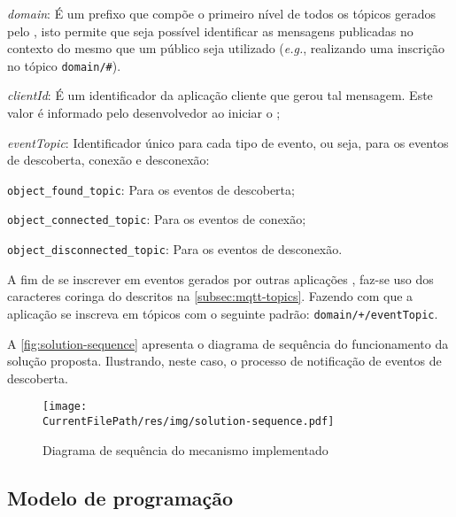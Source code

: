\begin{alineas}
	\item \emph{domain}: É um prefixo que compõe o primeiro nível de todos os tópicos gerados pelo \cddl, isto permite que seja possível identificar as mensagens publicadas no contexto do \middleware mesmo que um \broker público seja utilizado (\textit{e.g.}, realizando uma inscrição no tópico \texttt{domain/\#}).

	\item \emph{clientId}: É um identificador da aplicação cliente que gerou tal mensagem. Este valor é informado pelo desenvolvedor ao iniciar o \cddl;

	\item \emph{eventTopic}: Identificador único para cada tipo de evento, ou seja, para os eventos de descoberta, conexão e desconexão:
	\begin{alineas}
		\item \texttt{object\_found\_topic}: Para os eventos de descoberta;
		\item \texttt{object\_connected\_topic}: Para os eventos de conexão;
		\item \texttt{object\_disconnected\_topic}: Para os eventos de desconexão.
	\end{alineas}
\end{alineas}


A fim de se inscrever em eventos gerados por outras aplicações \mhubcddl, faz-se uso dos caracteres coringa do \mqtt descritos na \autoref{subsec:mqtt-topics}. Fazendo com que a aplicação se inscreva em tópicos com o seguinte padrão: \texttt{domain/+/eventTopic}.


A \autoref{fig:solution-sequence} apresenta o diagrama de sequência do funcionamento da solução proposta. Ilustrando, neste caso, o processo de notificação de eventos de descoberta.

\begin{figure}[htb]
	\centering
	\caption{Diagrama de sequência do mecanismo implementado}
	\texttt{[image: \\CurrentFilePath/res/img/solution-sequence.pdf]}
	\fonte{\autoriapropria}
	\label{fig:solution-sequence}
\end{figure}

\subsection{Modelo de programação}

